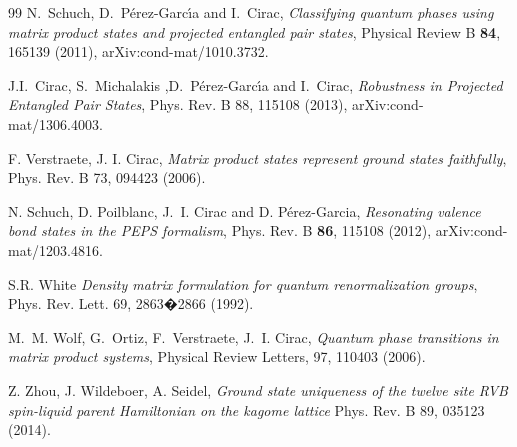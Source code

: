 \documentclass[cmp]{svjour}
\begin{document}
\begin{thebibliography}{99}
    N.~{Schuch}, D.~{P{\'e}rez-Garc{\'{\i}}a} and  I.~{Cirac},
    \newblock \emph{Classifying quantum phases using matrix product states and projected entangled pair states},
    \newblock Physical Review B {\bf 84}, 165139 (2011), arXiv:cond-mat/1010.3732.

    J.I.~Cirac, S.~Michalakis ,D.~{P{\'e}rez-Garc{\'{\i}}a} and  I.~{Cirac},
    \newblock  \emph{Robustness in Projected Entangled Pair States},
    \newblock Phys. Rev. B 88, 115108 (2013), arXiv:cond-mat/1306.4003.



    F. Verstraete, J. I. Cirac,
    \newblock \emph{Matrix product states represent ground states faithfully},
    \newblock Phys. Rev. B 73, 094423 (2006).


    N. Schuch, D. Poilblanc, J.~I. Cirac and D. Pérez-Garcia, \emph{Resonating valence bond states in the PEPS formalism},
    \newblock Phys. Rev. B {\bf 86}, 115108 (2012), arXiv:cond-mat/1203.4816.


    S.R. White
    \newblock \emph{Density matrix formulation for quantum renormalization groups},
    \newblock  Phys. Rev. Lett. 69, 2863�2866 (1992).

    M.~M. Wolf, G.~Ortiz, F.~Verstraete, J.~I. Cirac,
    \newblock \emph{Quantum phase transitions in matrix product systems},
    \newblock Physical Review Letters, 97, 110403 (2006).




    Z. Zhou, J. Wildeboer, A. Seidel,
    \newblock \emph{Ground state uniqueness of the twelve site RVB spin-liquid parent Hamiltonian on the kagome lattice}
    \newblock Phys. Rev. B 89, 035123 (2014).





\end{thebibliography}
\end{document}
